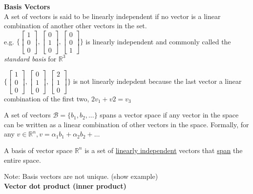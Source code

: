 \documentclass[../main.tex]{subfiles}
\begin{document}
  \textbf{Basis Vectors} \\

  A set of vectors is said to be linearly independent if no vector is a linear combination of another other vectors in the set. \\

  e.g. $\{ \begin{bmatrix} 1 \\ 0 \\ 0 \end{bmatrix}, \begin{bmatrix} 0 \\ 1 \\ 0 \end{bmatrix}, \begin{bmatrix} 0 \\ 0 \\ 1 \end{bmatrix} \}$ is linearly independent and commonly called the \textit{standard basis} for $\mathbb{R}^{3}$

  $\{ \begin{bmatrix} 1 \\ 0 \\ 0 \end{bmatrix}, \begin{bmatrix} 0 \\ 1 \\ 0 \end{bmatrix}, \begin{bmatrix} 2 \\ 1 \\ 0 \end{bmatrix} \}$ is not linearly indepdent because the last vector a linear combination of the first two, $2v_{1} + v{2} = v_{3}$

  A set of vectors $\mathcal{B} = \{b_{1}, b_{2}, ...\}$ spans a vector space if any vector in the space can be written as a linear combination of other vectors in the space. Formally, for any $v \in \mathbb{R}^{n}, v = \alpha_{1} b_{1} + \alpha_{2} b_{2} + \ldots$

  A basis of vector space $\mathbb{R}^{n}$ is a set of \underline{linearly independent} vectors that \underline{span} the entire space.

  Note: Basis vectors are not unique. (show example) \\


  \textbf{Vector dot product (inner product)}
\end{document}

